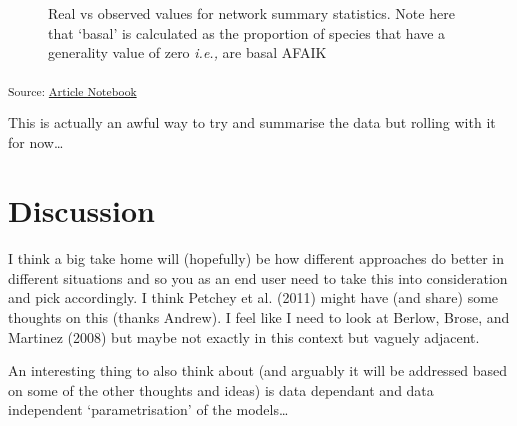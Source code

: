 \documentclass[
  letterpaper,
  DIV=11,
  numbers=noendperiod]{scrartcl}
\begin{document}
\begin{figure}[H]


\caption{\label{fig-topology}Real vs observed values for network summary
statistics. Note here that `basal' is calculated as the proportion of
species that have a generality value of zero \emph{i.e.,} are basal
AFAIK}

\end{figure}%

\textsubscript{Source:
\href{https://BecksLab.github.io/ms_t_is_for_topology/index.qmd.html}{Article
Notebook}}

This is actually an awful way to try and summarise the data but rolling
with it for now\ldots{}

\section{Discussion}\label{discussion}

I think a big take home will (hopefully) be how different approaches do
better in different situations and so you as an end user need to take
this into consideration and pick accordingly. I think Petchey et al.
(2011) might have (and share) some thoughts on this (thanks Andrew). I
feel like I need to look at Berlow, Brose, and Martinez (2008) but maybe
not exactly in this context but vaguely adjacent.

An interesting thing to also think about (and arguably it will be
addressed based on some of the other thoughts and ideas) is data
dependant and data independent `parametrisation' of the models\ldots{}
\end{document}
